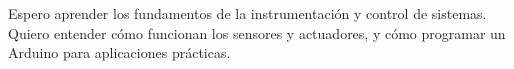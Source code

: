 Espero aprender los fundamentos de la instrumentación y control de sistemas. 
Quiero entender cómo funcionan los sensores y actuadores, 
y cómo programar un Arduino para aplicaciones prácticas.